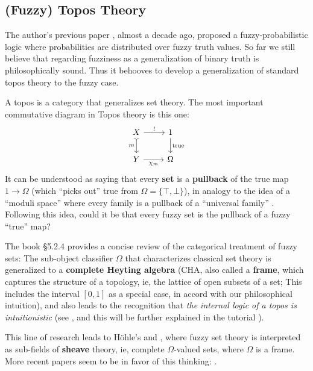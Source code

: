 \documentclass[orivec]{llncs}
\begin{document}
\subsection{(Fuzzy) Topos Theory}

The author's previous paper \cite{Yan2012}, almost a decade ago, proposed a fuzzy-probabilistic logic where probabilities are distributed over fuzzy truth values.  So far we still believe that regarding fuzziness as a generalization of binary truth is philosophically sound.  Thus it behooves to develop a generalization of standard topos theory to the fuzzy case.  

A topos is a category that generalizes set theory.  The most important commutative diagram in Topos theory is this one:
\begin{equation}
\label{eqn:subobject-classifier}
\begin{tikzcd}[column sep = normal]
X \arrow[r, "!"] \arrow[d, tail, swap, "m"] & 1 \arrow[d, "\mathrm{true}"] \\
Y \arrow[r, swap, "\chi_m"] & \Omega
\end{tikzcd}
\end{equation}
It can be understood as saying that every \textbf{set} is a \textbf{pullback} of the true map $1 \rightarrow \Omega$ (which ``picks out'' true from $\Omega = \{ \top, \bot \}$), in analogy to the idea of a ``moduli space'' where every family is a pullback of a ``universal family'' \cite{Schlichenmaier2010} \cite{Harris2006}.  Following this idea, could it be that every fuzzy set is the pullback of a fuzzy ``true'' map?  

The book \cite{Belohlavek2017} \S5.2.4 provides a concise review of the categorical treatment of fuzzy sets:  The sub-object classifier $\Omega$ that characterizes classical set theory is generalized to a \textbf{complete Heyting algebra} (CHA, also called a \textbf{frame}, which captures the structure of a topology, ie, the lattice of open subsets of a set;  This includes the interval $[0,1]$ as a special case, in accord with our philosophical intuition), and also leads to the recognition that \textit{the internal logic of a topos is intuitionistic} (see \cite{MacLane1992}, and this will be further explained in the tutorial \cite{Yan2021}).

This line of research leads to H\"{o}hle's \cite{Hohle2007} and \cite{Hohle2007b}, where fuzzy set theory is interpreted as sub-fields of \textbf{sheave} theory, ie, complete $\Omega$-valued sets, where $\Omega$ is a frame.  More recent papers seem to be in favor of this thinking: \cite{Jardine2019} \cite{Vickers2010}.
\end{document}

